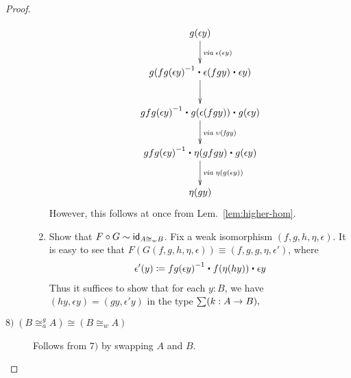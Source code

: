 \begin{proof}
\begin{description}
\begin{enumerate}
\begin{align*}
\xymatrix{
g(\epsilon y) \ar[d]^{\mathit{via \;} \epsilon(\epsilon y)} \\
g(\opp{fg(\epsilon y)} \ct \epsilon (f g y) \ct \epsilon y) \ar[d] \\
\opp{gfg(\epsilon y)} \ct g(\epsilon (f g y)) \ct g(\epsilon y) \ar[d]^{\mathit{via \; \upsilon(fgy)}}  \\
\opp{gfg(\epsilon y)} \ct \eta (gfgy) \ct g(\epsilon y) \ar[d]^{\mathit{via \;} \eta(g(\epsilon y))} \\
\eta(g y)}
\end{align*}
However, this follows at once from Lem.~\ref{lem:higher-hom}. \\



\item Show that $F \circ G \sim \idfunc[A \cong_w B]$. Fix a weak isomorphism $(f,g,h,\eta,\epsilon)$. It is easy to see that $F(G(f,g,h,\eta,\epsilon)) \equiv (f,g,g,\eta,\epsilon')$, where
\begin{align*}
\epsilon'(y) \defeq \opp{fg(\epsilon y)} \ct f(\eta (h y)) \ct \epsilon y
\end{align*}
Thus it suffices to show that for each $y : B$, we have $(h y, \epsilon y) = (g y, \epsilon' y)$ in the type $\sm{k : A \to B}$





\end{enumerate}


\item[$\mathit{8)} \; (B \cong^g_a A) \cong  (B \cong_w A)$]  Follows from $\mathit{7)}$ by swapping $A$ and $B$.
\end{description}
\end{proof}

